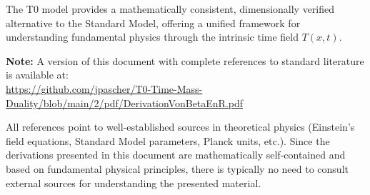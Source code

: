 \documentclass[12pt,a4paper]{article}
\begin{document}
	The T0 model provides a mathematically consistent, dimensionally verified alternative to the Standard Model, offering a unified framework for understanding fundamental physics through the intrinsic time field $T(x,t)$.
	
	
	\begin{thebibliography}{9}
\textbf{Note:} A version of this document with complete references to standard literature is available at: \\
\url{https://github.com/jpascher/T0-Time-Mass-Duality/blob/main/2/pdf/DerivationVonBetaEnR.pdf}

All references point to well-established sources in theoretical physics (Einstein's field equations, Standard Model parameters, Planck units, etc.). Since the derivations presented in this document are mathematically self-contained and based on fundamental physical principles, there is typically no need to consult external sources for understanding the presented material.
	

	\end{thebibliography}
	
\end{document}

